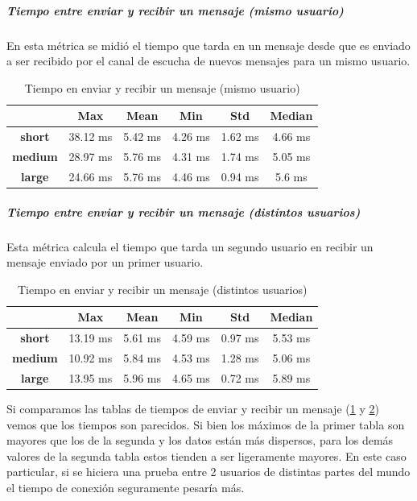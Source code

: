 \subparagraph{Tiempo entre enviar y recibir un mensaje (mismo usuario)}

En esta métrica se midió el tiempo que tarda en un mensaje desde que es enviado a ser recibido por el canal de escucha de nuevos mensajes para un mismo usuario.

\setlength\tabcolsep{10pt}
\begin{table}[H]
    \centering
    \begin{tabular}{|c|c|c|c|c|c|}
    \hline
    & \textbf{Max} & \textbf{Mean} & \textbf{Min} & \textbf{Std} & \textbf{Median} \\
    \hline
    \textbf{short} & 38.12 ms & 5.42 ms & 4.26 ms & 1.62 ms & 4.66 ms \\
    \hline
    \textbf{medium} & 28.97 ms & 5.76 ms & 4.31 ms & 1.74 ms & 5.05 ms \\
    \hline
    \textbf{large} & 24.66 ms & 5.76 ms & 4.46 ms & 0.94 ms & 5.6 ms \\
    \hline
    \end{tabular}
    \caption{Tiempo en enviar y recibir un mensaje (mismo usuario)}
    \label{tab:tiempo-send-recv-same-user}
\end{table}

\subparagraph{Tiempo entre enviar y recibir un mensaje (distintos usuarios)}

Esta métrica calcula el tiempo que tarda un segundo usuario en recibir un mensaje enviado por un primer usuario.

\setlength\tabcolsep{10pt}
\begin{table}[H]
    \centering
    \begin{tabular}{|c|c|c|c|c|c|}
    \hline
    & \textbf{Max} & \textbf{Mean} & \textbf{Min} & \textbf{Std} & \textbf{Median} \\
    \hline
    \textbf{short} & 13.19 ms & 5.61 ms & 4.59 ms & 0.97 ms & 5.53 ms \\
    \hline
    \textbf{medium} & 10.92 ms & 5.84 ms & 4.53 ms & 1.28 ms & 5.06 ms \\
    \hline
    \textbf{large} & 13.95 ms & 5.96 ms & 4.65 ms & 0.72 ms & 5.89 ms \\
    \hline
    \end{tabular}
    \caption{Tiempo en enviar y recibir un mensaje (distintos usuarios)}
    \label{tab:tiempo-send-recv-diff-user}
\end{table}

Si comparamos las tablas de tiempos de enviar y recibir un mensaje (\ref{tab:tiempo-send-recv-same-user} y \ref{tab:tiempo-send-recv-diff-user}) vemos que los tiempos son parecidos. Si bien los máximos de la primer tabla son mayores que los de la segunda y los datos están más dispersos, para los demás valores de la segunda tabla estos tienden a ser ligeramente mayores. En este caso particular, si se hiciera una prueba entre 2 usuarios de distintas partes del mundo el tiempo de conexión seguramente pesaría más.
